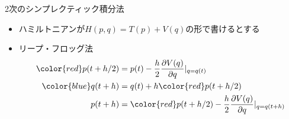 \begin{frame}[t,fragile]{2次のシンプレクティック積分法}
  \begin{itemize}
    \setlength{\itemsep}{1em}
  \item ハミルトニアンが$H(p,q) = T(p) + V(q)$の形で書けるとする
  \item リープ・フロッグ法
    \begin{align*}
      {\color{red} p(t+h/2)} &= p(t) - \frac{h}{2} \frac{\partial V(q)}{\partial q}|_{q=q(t)} \\
      {\color{blue} q(t+h)} &= q(t) + h {\color{red}p(t+h/2)} \\
      p(t+h) &= {\color{red}p(t+h/2}) - \frac{h}{2} \frac{\partial V(q)}{\partial q}|_{q=q(t+h)}
    \end{align*}
  \end{itemize}
\end{frame}
